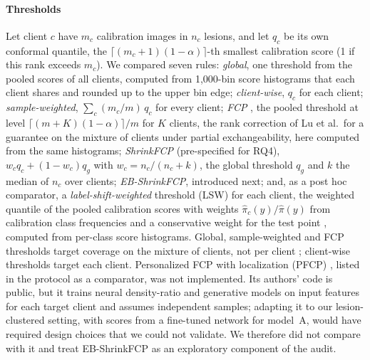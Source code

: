 \paragraph{Thresholds} Let client $c$ have $m_c$ calibration images in $n_c$ lesions, and let $q_c$ be
its own conformal quantile, the $\lceil (m_c+1)(1-\alpha)\rceil$-th smallest calibration score (1 if this
rank exceeds $m_c$). We compared seven rules:
\emph{global}, one threshold from the pooled scores of all clients, computed from 1,000-bin score
histograms that each client shares and rounded up to the upper bin edge;
\emph{client-wise}, $q_c$ for each client;
\emph{sample-weighted}, $\sum_c (m_c/m)\,q_c$ for every client;
\emph{FCP} \cite{lu2023fcp}, the pooled threshold at level $\lceil (m+K)(1-\alpha)\rceil/m$ for $K$
clients, the rank correction of Lu et al.\ for a guarantee on the mixture of clients under partial
exchangeability, here computed from the same histograms;
\emph{ShrinkFCP} (pre-specified for RQ4), $w_c q_c + (1-w_c) q_g$ with $w_c=n_c/(n_c+k)$, the global
threshold $q_g$ and $k$ the median of $n_c$ over clients;
\emph{EB-ShrinkFCP}, introduced next; and, as a post hoc comparator, a \emph{label-shift-weighted}
threshold (LSW) for each client, the weighted quantile of the pooled calibration scores with weights
$\hat\pi_c(y)/\hat\pi(y)$ from calibration class frequencies and a conservative weight for the test point
\cite{podkopaev2021labelshift,plassier2023labelshift}, computed from per-class score histograms. Global,
sample-weighted and FCP thresholds target coverage on the mixture of clients, not per client
\cite{lu2023fcp}; client-wise thresholds target each client. Personalized FCP with localization (PFCP) \cite{min2025pfcp}, listed in the protocol as a comparator, was not implemented. Its authors' code is public, but it trains neural density-ratio and generative models on input features for each target client and assumes independent samples; adapting it to our lesion-clustered setting, with scores from a fine-tuned network for model~A, would have required design choices that we could not validate. We therefore did not compare with it and treat EB-ShrinkFCP as an exploratory component of the audit.

